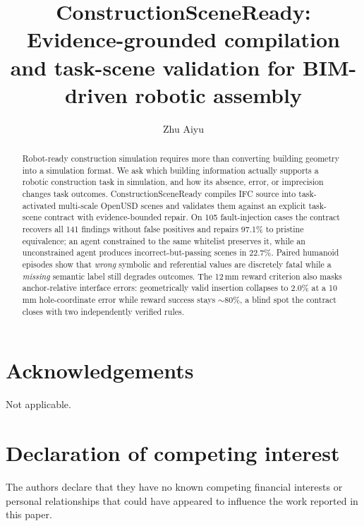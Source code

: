 \documentclass[preprint,12pt]{elsarticle}
\begin{document}
\begin{frontmatter}

\title{ConstructionSceneReady: Evidence-grounded compilation and task-scene
validation for BIM-driven robotic assembly}

\author[aff1]{Zhu Aiyu}


\begin{abstract}
Robot-ready construction simulation requires more than converting building
geometry into a simulation format. We ask which building information actually
supports a robotic construction task in simulation, and how its absence,
error, or imprecision changes task outcomes. ConstructionSceneReady compiles
IFC source into task-activated multi-scale OpenUSD scenes and validates them
against an explicit task-scene contract with evidence-bounded repair. On 105
fault-injection cases the contract recovers all 141 findings without false
positives and repairs 97.1\% to pristine equivalence; an agent constrained to
the same whitelist preserves it, while an unconstrained agent produces
incorrect-but-passing scenes in 22.7\%. Paired humanoid episodes show that
\emph{wrong} symbolic and referential values are discretely fatal while a
\emph{missing} semantic label still degrades outcomes. The 12\,mm reward
criterion also masks anchor-relative interface errors: geometrically valid
insertion collapses to
2.0\% at a 10\,mm hole-coordinate error while reward success stays
${\sim}80\%$, a blind spot the contract closes with two independently
verified rules.
\end{abstract}

\end{frontmatter}

\section*{Acknowledgements}
Not applicable.

\section*{Declaration of competing interest}
The authors declare that they have no known competing financial interests or
personal relationships that could have appeared to influence the work reported
in this paper.
\end{document}
